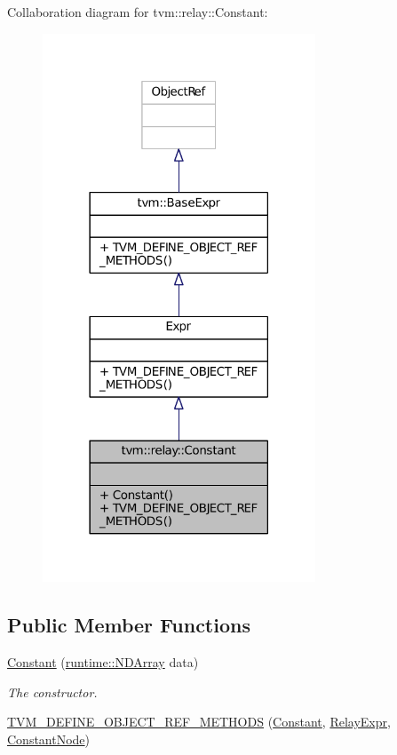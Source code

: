 Collaboration diagram for tvm\+:\+:relay\+:\+:Constant\+:
\nopagebreak
\begin{figure}[H]
\begin{center}
\leavevmode
\includegraphics[width=230pt]{classtvm_1_1relay_1_1Constant__coll__graph}
\end{center}
\end{figure}
\subsection*{Public Member Functions}
\begin{DoxyCompactItemize}
\item 
\hyperlink{classtvm_1_1relay_1_1Constant_a382dada45fd9cd7eedd24a6741201f87}{Constant} (\hyperlink{classtvm_1_1runtime_1_1NDArray}{runtime\+::\+N\+D\+Array} data)
\begin{DoxyCompactList}\small\item\em The constructor. \end{DoxyCompactList}\item 
\hyperlink{classtvm_1_1relay_1_1Constant_a15da36fc6e073997d7363e1979eda258}{T\+V\+M\+\_\+\+D\+E\+F\+I\+N\+E\+\_\+\+O\+B\+J\+E\+C\+T\+\_\+\+R\+E\+F\+\_\+\+M\+E\+T\+H\+O\+DS} (\hyperlink{classtvm_1_1relay_1_1Constant}{Constant}, \hyperlink{classtvm_1_1RelayExpr}{Relay\+Expr}, \hyperlink{classtvm_1_1relay_1_1ConstantNode}{Constant\+Node})
\end{DoxyCompactItemize}


